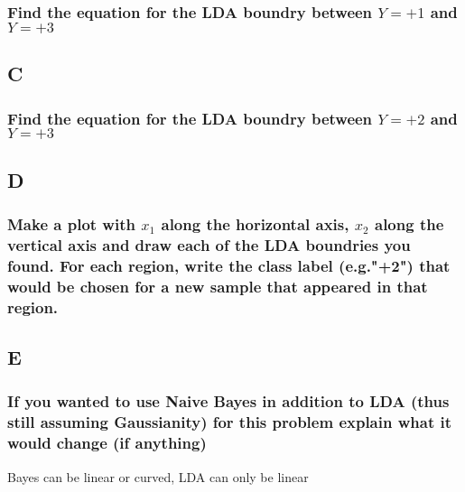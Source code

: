 \documentclass[12pt]{article}
\begin{document}
\subsubsection{Find the equation for the LDA boundry between $Y = +1$ and $Y = +3$}

\subsection{C}
\subsubsection{Find the equation for the LDA boundry between $Y = +2$ and $Y = +3$}

\subsection{D}
\subsubsection{Make a plot with $x_1$ along the horizontal axis, $x_2$ along the vertical axis and draw each of the LDA boundries you found. For each region, write the class label (e.g."+2") that would be chosen for a new sample that appeared in that region.}

\subsection{E}
\subsubsection{If you wanted to use Naive Bayes in addition to LDA (thus still assuming Gaussianity) for this problem explain what it would change (if anything)}
Bayes can be linear or curved, LDA can only be linear


\pagebreak
\end{document}
